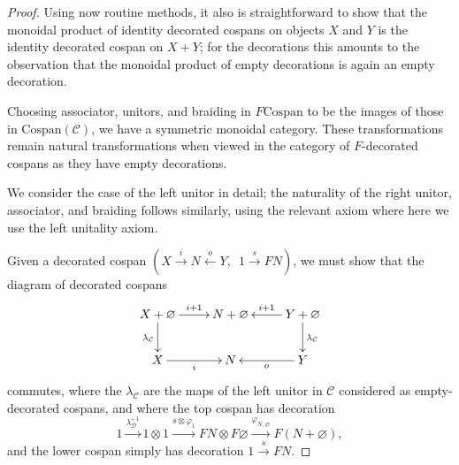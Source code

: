 \begin{proof}
Using now routine methods, it also is straightforward to show that the monoidal
product of identity decorated cospans on objects $X$ and $Y$ is the identity
decorated cospan on $X+Y$; for the decorations this amounts to the observation
that the monoidal product of empty decorations is again an empty decoration.

  Choosing associator, unitors, and braiding in $F\mathrm{Cospan}$ to be the
  images of those in $\mathrm{Cospan(\mathcal{C})}$, we have a symmetric
  monoidal category. These transformations remain natural transformations when
  viewed in the category of $F$-decorated cospans as they have empty
  decorations.
  
We consider the case of the left unitor in detail; the naturality of the right unitor,
associator, and braiding follows similarly, using the relevant axiom where here
we use the left unitality axiom.

Given a decorated cospan $(X \stackrel{i}\longrightarrow N
\stackrel{o}\longleftarrow Y,\enspace 1 \stackrel{s}\longrightarrow FN)$, we
must show that the diagram of decorated cospans
\[
  \xymatrix{
    X+\varnothing \ar[r]^{i+1} \ar[d]_{\lambda_{\mathcal C}} & N+\varnothing & Y+\varnothing
    \ar[l]_{i+1} \ar[d]^{\lambda_{\mathcal C}} \\
    X \ar[r]_{i} & N & Y \ar[l]^{o} 
  }
\]
commutes, where the $\lambda_{\mathcal C}$ are the maps of the left unitor in $\mathcal C$
considered as empty-decorated cospans, and where the top cospan has decoration 
\[
  1 \stackrel{\lambda^{-1}_{\mathcal D}}{\longrightarrow} 1 \otimes 1 \stackrel{s \otimes
  \varphi_1}\longrightarrow FN \otimes F\varnothing
  \stackrel{\varphi_{N,\varnothing}}\longrightarrow F(N+\varnothing),
\]
and the lower cospan simply has decoration $1 \stackrel{s}{\longrightarrow} FN$. 


\end{proof}
